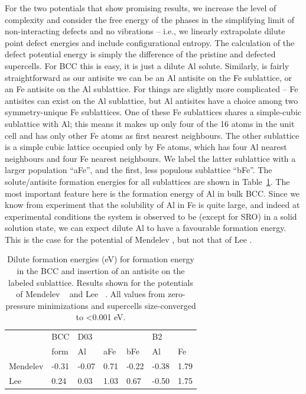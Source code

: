 For the two potentials that show promising results, we increase the level of complexity and consider the free energy of the phases in the simplifying limit of non-interacting defects and no vibrations -- i.e., we linearly extrapolate dilute point defect energies and include configurational entropy.
The calculation of the defect potential energy is simply the difference of the pristine and defected supercells.
For BCC this is easy, it is just a dilute Al solute.
Similarly, \BTWO is fairly straightforward as our antisite we can be an Al antisite on the Fe sublattice, or an Fe antisite on the Al sublattice.
For \DOTHREE things are slightly more complicated -- Fe antisites can exist on the Al sublattice, but Al antisites have a choice among two symmetry-unique Fe sublattices.
One of these Fe sublattices shares a simple-cubic sublattice with Al; this means it makes up only four of the 16 atoms in the \DOTHREE unit cell and has only other Fe atoms as first nearest neighbours.
The other sublattice is a simple cubic lattice occupied only by Fe atoms, which has four Al nearest neighbours and four Fe nearest neighbours.
We label the latter sublattice with a larger population ``aFe'', and the first, less populous sublattice ``bFe''.
The solute/antisite formation energies for all sublattices are shown in Table~\ref{tab:dilute}.
The most important feature here is the formation energy of Al in bulk BCC.
Since we know from experiment that the solubility of Al in Fe is quite large, and indeed at experimental conditions the system is observed to be (except for SRO) in a solid solution state, we can expect dilute Al to have a favourable formation energy.
This is the case for the potential of Mendelev \etal, but not that of Lee \etal.
%
\begin{table}[]
    \centering
    \label{tab:dilute}
    \begin{tabular}{l|l|lll|ll}
                 & BCC   & \multicolumn{3}{l|}{D03} & \multicolumn{2}{l}{B2} \\
                 & form  & Al      & aFe   & bFe    & Al         & Fe        \\ \hline
        Mendelev & -0.31 & -0.07   & 0.71  & -0.22  & -0.38      & 1.79      \\
        Lee      & 0.24  & 0.03    & 1.03  & 0.67   & -0.50      & 1.75
    \end{tabular}
    \caption{Dilute formation energies (eV) for formation energy in the BCC and insertion of an antisite on the labeled sublattice. Results shown for the potentials of Mendelev \etal~\cite{mendelev2005effect} and Lee \etal~\cite{lee2010modified}. All values from zero-pressure minimizations and supercells size-converged to <0.001 eV.}
\end{table}

